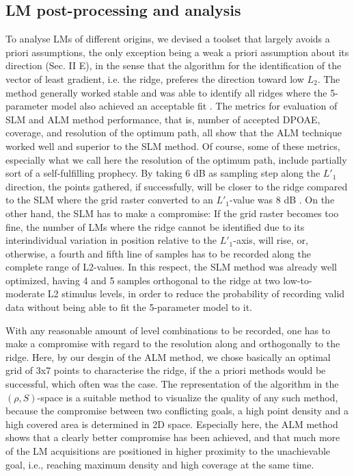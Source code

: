 \documentclass[journal,twoside,web]{ieeecolor2}
\begin{document}
\subsection{LM post-processing and analysis}
To analyse LMs of different origins, we devised a toolset that largely avoids a priori assumptions, the only exception being a weak a priori assumption about its direction (Sec. II E), in the sense that the algorithm for the identification of the vector of least gradient, i.e. the ridge, preferes the direction toward low $L_2$.
The method generally worked stable and was able to identify all ridges where the 5-parameter model also achieved an acceptable fit .
The metrics for evaluation of SLM and ALM method performance, that is, number of accepted DPOAE, coverage, and resolution of the optimum path, all show that the ALM technique worked well and superior to the SLM method.
Of course, some of these metrics, especially what we call here the resolution of the optimum path, include partially sort of a self-fulfilling prophecy.
By taking 6 dB as sampling step along the $L'_1$ direction, the points gathered, if successfully, will be closer to the ridge compared to the SLM where the grid raster converted to an $L'_1$-value was 8 dB .
On the other hand, the SLM has to make a compromise: If the grid raster becomes too fine, the number of LMs where the ridge cannot be identified due to its interindividual variation in position relative to the $L'_1$-axis, will rise, or, otherwise, a fourth and fifth line of samples has to be recorded along the complete range of L2-values.
In this respect, the SLM method was already well optimized, having 4 and 5 samples orthogonal to the ridge at two low-to-moderate L2 stimulus levels, in order to reduce the probability of recording valid data without being able to fit the 5-parameter model to it.

With any reasonable amount of  level combinations to be recorded, one has to make a compromise with regard to the resolution along and orthogonally to the ridge.
Here, by our desgin of the ALM method, we chose basically an optimal grid of 3x7 points to characterise the ridge, if the a priori methods would be successful, which often was the case.
The representation of the algorithm in the $(\rho, S)$-space is a suitable method to visualize the quality of any such method, because the compromise between two conflicting goals, a high point density and a high covered area is determined in 2D space.
Especially here, the ALM method shows that a clearly better compromise has been achieved, and that much more of the LM acquisitions are positioned in higher proximity to the unachievable goal, i.e., reaching maximum density and high coverage at the same time.
\end{document}
